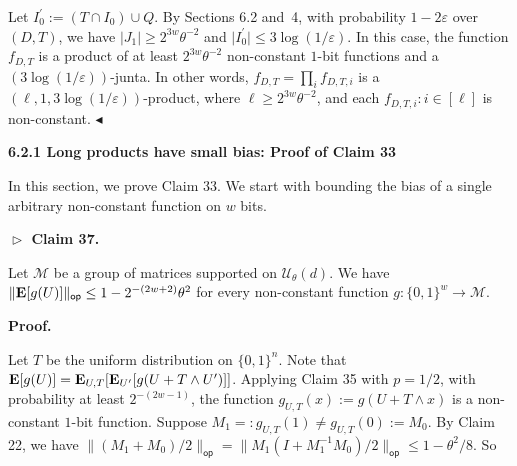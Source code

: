 Let $I_{0}^{\prime}:=(T\cap I_{0})\cup Q$.
By Sections 6.2 and 4, with probability $1-2\varepsilon$ over $(D,T)$, we have $\lvert J_{1}\rvert\geq 2^{3w}\theta^{-2}$ and $\lvert I_{0}^{\prime}\rvert\leq 3\log(1/\varepsilon)$.
In this case, the function $f_{D,T}$ is a product of at least $2^{3w}\theta^{-2}$ non-constant $1$-bit functions and a $(3\log(1/\varepsilon))$-junta.
In other words, $f_{D,T}=\prod_{i}f_{D,T,i}$ is a $(\ell,1,3\log(1/\varepsilon))$-product, where $\ell\geq 2^{3w}\theta^{-2}$, and each $f_{D,T,i}:i\in[\ell]$ is non-constant.
$\blacktriangleleft$\par





\par\medskip\noindent\textbf{
6.2.1 Long products have small bias: Proof of Claim 33
}\par




In this section, we prove Claim 33.
We start with bounding the bias of a single arbitrary non-constant function on $w$ bits.\par





\par\medskip\noindent\textbf{
$\vartriangleright$ Claim 37. }\par



Let $\mathcal{M}$ be a group of matrices supported on $\mathcal{U}_{\theta}(d)$.
We have $\lVert\mathop{\bf E\/}[g(U)]\rVert_{\mathsf{op}}\leq 1-2^{-(2w+2)}\theta^{2}$ for every non-constant function $g\colon\{0,1\}^{w}\to\mathcal{M}$.\par






\par\medskip\noindent\textbf{
\textbf{Proof}.}\par




Let $T$ be the uniform distribution on $\{0,1\}^{n}$.
Note that $\mathop{\bf E\/}[g(U)]=\mathop{\bf E\/}_{U,T}[\mathop{\bf E\/}_{U^{\prime}}[g(U+T\wedge U^{\prime})]]$.
Applying Claim 35 with $p=1/2$, with probability at least $2^{-(2w-1)}$, the function $g_{U,T}(x):=g(U+T\wedge x)$ is a non-constant $1$-bit function.
Suppose $M_{1}=:g_{U,T}(1)\neq g_{U,T}(0):=M_{0}$.
By Claim 22, we have $\lVert(M_{1}+M_{0})/2\rVert_{\mathsf{op}}=\lVert M_{1}(I+M_{1}^{-1}M_{0})/2\rVert_{\mathsf{op}}\leq 1-\theta^{2}/8$.
So\par


